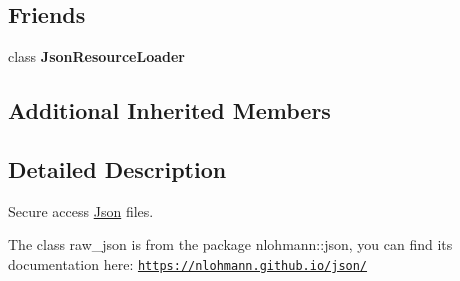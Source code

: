 \subsection*{Friends}
\begin{DoxyCompactItemize}
\item 
\mbox{\label{classTarbora_1_1Json_aee50c6631e13cfeca7c547d5cba72f8c}} 
class {\bfseries Json\+Resource\+Loader}
\end{DoxyCompactItemize}
\subsection*{Additional Inherited Members}


\subsection{Detailed Description}
Secure access \hyperlink{classTarbora_1_1Json}{Json} files. 

The class raw\+\_\+json is from the package nlohmann\+::json, you can find its documentation here\+: \href{https://nlohmann.github.io/json/}{\tt https\+://nlohmann.\+github.\+io/json/}


